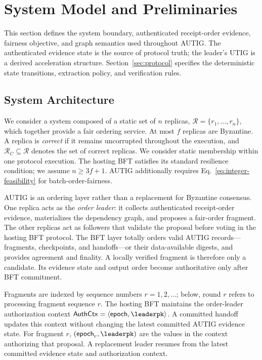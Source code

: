 
\section{System Model and Preliminaries}
\label{sec:model}

This section defines the system boundary, authenticated receipt-order evidence,
fairness objective, and graph semantics used throughout AUTIG.  The
authenticated evidence state is the source of protocol truth; the leader's
UTIG is a derived acceleration structure.  Section~\ref{sec:protocol}
specifies the deterministic state transitions, extraction policy, and
verification rules.

\subsection{System Architecture}
\label{sec:system-architecture}

We consider a system composed of a static set of $n$ replicas,
$\mathcal R=\{r_1,\ldots,r_n\}$, which together provide a fair ordering
service.  At most $f$ replicas are Byzantine.  A replica is \emph{correct} if
it remains uncorrupted throughout the execution, and
$\mathcal R_C\subseteq\mathcal R$ denotes the set of correct replicas.  We
consider static membership within one protocol execution.  The hosting BFT
satisfies its standard resilience condition; we assume $n\ge3f+1$.  AUTIG
additionally requires Eq.~\eqref{eq:integer-feasibility} for
batch-order-fairness.

AUTIG is an ordering layer rather than a replacement for Byzantine consensus.
One replica acts as the \emph{order leader}: it collects authenticated
receipt-order evidence, materializes the dependency graph, and proposes a
fair-order fragment.  The other replicas act as followers that validate the
proposal before voting in the hosting BFT protocol.  The BFT layer totally
orders valid AUTIG records---fragments, checkpoints, and handoffs---or their
data-available digests, and provides agreement and finality.  A locally
verified fragment is therefore only a candidate.  Its evidence state and
output order become authoritative only after BFT commitment.

Fragments are indexed by sequence numbers $r=1,2,\ldots$; below, round $r$
refers to processing fragment sequence $r$.  The hosting BFT maintains the
order-leader authorization context
$\mathsf{AuthCtx}=\langle\mathsf{epoch},\leaderpk\rangle$.  A committed handoff
updates this context without changing the latest committed AUTIG evidence
state.  For fragment $r$, $(\mathsf{epoch}_r,\leaderpk)$ are the values in the
context authorizing that proposal.  A replacement leader resumes from the
latest committed evidence state and authorization context.

